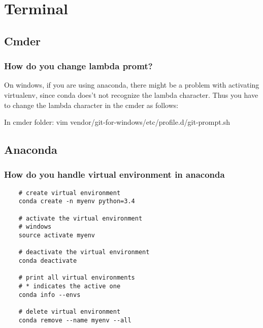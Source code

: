 \chapter{   Terminal}

\section{Cmder}

\subsection{How do you change lambda promt?}
On windows, if you are using anaconda, there might be a problem with activating virtualenv, since conda does't not recognize the lambda character. Thus you have to change the lambda character in the cmder as follows:

In cmder folder:
vim vendor/git-for-windows/etc/profile.d/git-prompt.sh




\section{Anaconda}

\subsection{How do you handle virtual environment in anaconda}
\begin{lstlisting}
    # create virtual environment
    conda create -n myenv python=3.4

    # activate the virtual environment
    # windows
    source activate myenv

    # deactivate the virtual environment
    conda deactivate

    # print all virtual environments
    # * indicates the active one
    conda info --envs

    # delete virtual environment
    conda remove --name myenv --all
\end{lstlisting}


